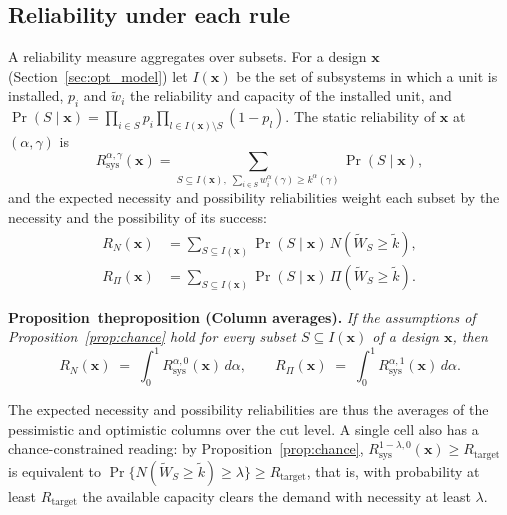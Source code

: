 \documentclass[Review,sagev,times]{sagej}%
\newcommand{\stmt}[3]{\refstepcounter{#1}\label{#2}#3~\csname the#1\endcsname}
\newcommand{\Rsys}{R_{\mathrm{sys}}}\newcommand{\Rtarget}{R_{\mathrm{target}}}
\newcommand{\kag}{k^{\alpha}(\gamma)}\newcommand{\WS}{\tilde{W}_S}\newcommand{\Zsuf}{Z^{\mathrm{suf}}}
\begin{document}
\subsection{Reliability under each rule} \label{sec:decomposition}
A reliability measure aggregates over subsets. For a design $\mathbf{x}$ (Section~\ref{sec:opt_model}) let
$I(\mathbf{x})$ be the set of subsystems in which a unit is installed, $p_i$ and $\tilde{w}_i$ the reliability
and capacity of the installed unit, and
$\Pr(S \mid \mathbf{x}) = \prod_{i \in S} p_i \prod_{l \in I(\mathbf{x}) \setminus S} (1-p_l)$. The static
reliability of $\mathbf{x}$ at $(\alpha,\gamma)$ is
\begin{equation}
\Rsys^{\alpha,\gamma}(\mathbf{x}) = \sum_{S \subseteq I(\mathbf{x}),\; \sum_{i \in S} w_i^\alpha(\gamma) \ge \kag} \Pr(S \mid \mathbf{x}),
\label{eq:static}
\end{equation}
and the expected necessity and possibility reliabilities weight each subset by the necessity and the
possibility of its success:
\begin{equation}
\begin{aligned}
R_N(\mathbf{x}) &= \sum_{S \subseteq I(\mathbf{x})} \Pr(S \mid \mathbf{x}) \, N(\WS \ge \tilde{k}),\\
R_\Pi(\mathbf{x}) &= \sum_{S \subseteq I(\mathbf{x})} \Pr(S \mid \mathbf{x}) \, \Pi(\WS \ge \tilde{k}).
\end{aligned}
\label{eq:rn_rpi_def}
\end{equation}

\textbf{\stmt{proposition}{prop:decomposition}{Proposition} (Column averages).} \textit{If the assumptions
of Proposition~\ref{prop:chance} hold for every subset $S\subseteq I(\mathbf{x})$ of a design $\mathbf{x}$, then}
\begin{equation}
R_{N}(\mathbf{x}) \;=\; \int_0^1 \Rsys^{\alpha,0}(\mathbf{x})\,d\alpha,
\qquad
R_{\Pi}(\mathbf{x}) \;=\; \int_0^1 \Rsys^{\alpha,1}(\mathbf{x})\,d\alpha .
\label{eq:decomposition}
\end{equation}

The expected necessity and possibility reliabilities are thus the averages of the pessimistic and optimistic
columns over the cut level. A single cell also has a chance-constrained reading: by
Proposition~\ref{prop:chance}, $\Rsys^{1-\lambda,0}(\mathbf{x}) \ge \Rtarget$ is equivalent to
$\Pr\{N(\WS \ge \tilde{k}) \ge \lambda\} \ge \Rtarget$, that is, with probability at least $\Rtarget$ the
available capacity clears the demand with necessity at least $\lambda$.
\end{document}
